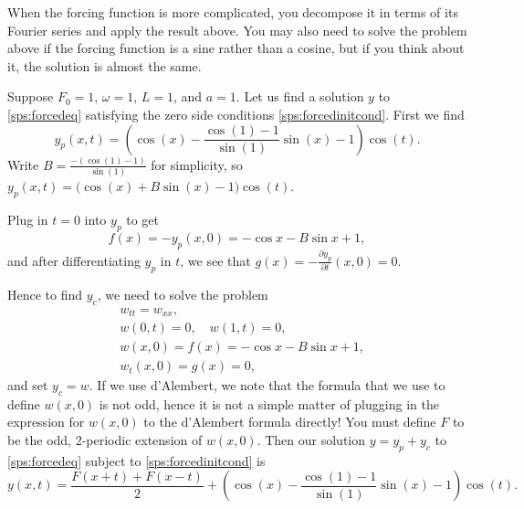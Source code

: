 When the forcing function is more complicated, you decompose it in terms of
its Fourier series and apply the result above.  You may also need to solve
the problem above if the forcing function is a sine rather than a cosine,
but if you think about it, the solution is almost the same.

\begin{example}
Suppose $F_0 = 1$, $\omega = 1$, $L=1$, and $a=1$.
Let us find a solution $y$ to \eqref{sps:forcedeq}
satisfying the zero side conditions
\eqref{sps:forcedinitcond}.  First we find
\begin{equation*}
y_p(x,t) =
\left(
\cos (x) -
\frac{\cos (1) - 1}{\sin (1)}
\sin (x)
-1
\right)
\cos (t) .
\end{equation*}
Write $B = \frac{-(\cos (1) - 1)}{\sin (1)}$ for simplicity,
so
$y_p(x,t) =
\bigl(
\cos (x) + B \sin (x) -1 \bigr) \cos (t)$.

Plug in $t=0$ into $y_p$ to get
\begin{equation*}
f(x) =- y_p(x,0) = 
- \cos x -
B \sin x
+1 ,
\end{equation*}
and after differentiating $y_p$ in $t$, we see that 
$g(x) = -\frac{\partial y_p}{\partial t}(x,0) = 0$.

Hence to find $y_c$, we need to solve the problem
\begin{align*}
& w_{tt} = w_{xx} , \\
& w(0,t) = 0 , \quad w(1,t) = 0 , \\
& w(x,0) = f(x) = - \cos x - B \sin x +1 , \\
& w_t(x,0) = g(x) = 0 ,
\end{align*}
and set $y_c=w$.
If we use d'Alembert, we note that
the formula that we use to define $w(x,0)$ is not odd,
hence it is not a simple matter of plugging in the expression for $w(x,0)$
to the d'Alembert
formula directly!  You must define $F$ to be the odd, 2-periodic
extension of $w(x,0)$.  Then our solution $y = y_p+y_c$ to
\eqref{sps:forcedeq} subject to \eqref{sps:forcedinitcond}
is
\begin{equation} \label{natfreq:exsol}
y(x,t) = 
\frac{F(x+t) + F(x-t)}{2} + 
\left(
\cos (x) -
\frac{\cos (1) - 1}{\sin (1)}
\sin (x)
-1
\right)
\cos (t) .
\end{equation}


\end{example}
